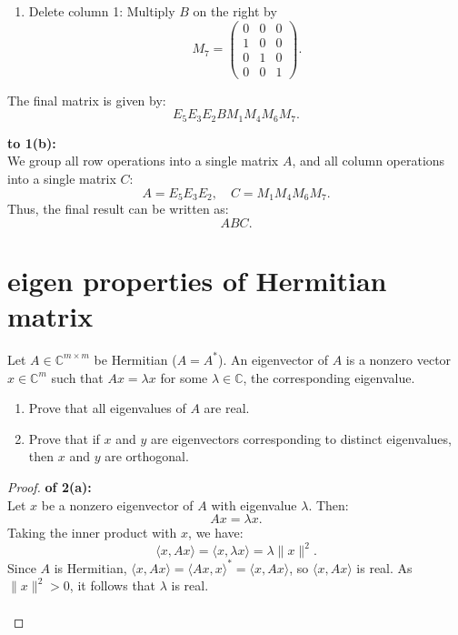 \documentclass[lang=cn,11pt]{elegantbook}
\begin{document}
\begin{solution}
\begin{enumerate}
    \[
    M_6 = 
    \begin{pmatrix}
    1 & 0 & 0 & 0 \\
    0 & 1 & 0 & 0 \\
    0 & 0 & 1 & 1 \\
    0 & 0 & 0 & 0
    \end{pmatrix}.
    \]
    \item Delete column 1: Multiply \( B \) on the right by
    \[
    M_7 = 
    \begin{pmatrix}
    0 & 0 & 0 \\
    1 & 0 & 0 \\
    0 & 1 & 0 \\
    0 & 0 & 1
    \end{pmatrix}.
    \]
\end{enumerate}

The final matrix is given by:
\[
E_5 E_3 E_2 B M_1 M_4 M_6 M_7.
\]
\end{solution}

\begin{solution}
\textbf{to 1(b):}\\

We group all row operations into a single matrix \( A \), and all column operations into a single matrix \( C \):
\[
A = E_5 E_3 E_2, \quad C = M_1 M_4 M_6 M_7.
\]
Thus, the final result can be written as:
\[
A B C.
\]
\end{solution}


\section{eigen properties of Hermitian matrix}

Let \( A \in \mathbb{C}^{m \times m} \) be Hermitian (\( A = A^* \)). An eigenvector of \( A \) is a nonzero vector \( x \in \mathbb{C}^m \) such that \( A x = \lambda x \) for some \( \lambda \in \mathbb{C} \), the corresponding eigenvalue.

\begin{enumerate}
    \item[(a)] Prove that all eigenvalues of \( A \) are real.
    \item[(b)] Prove that if \( x \) and \( y \) are eigenvectors corresponding to distinct eigenvalues, then \( x \) and \( y \) are orthogonal.
\end{enumerate}

\begin{proof}
\textbf{of 2(a):}\\
Let \( x \) be a nonzero eigenvector of \( A \) with eigenvalue \( \lambda \). Then:
\[
A x = \lambda x.
\]
Taking the inner product with \( x \), we have:
\[
\langle x, A x \rangle = \langle x, \lambda x \rangle = \lambda \|x\|^2.
\]
Since \( A \) is Hermitian, \( \langle x, A x \rangle = \langle A x, x \rangle^* = \langle x, A x \rangle \), so \( \langle x, A x \rangle \) is real. As \( \|x\|^2 > 0 \), it follows that \( \lambda \) is real.\\\\
\end{proof}
\end{document}
